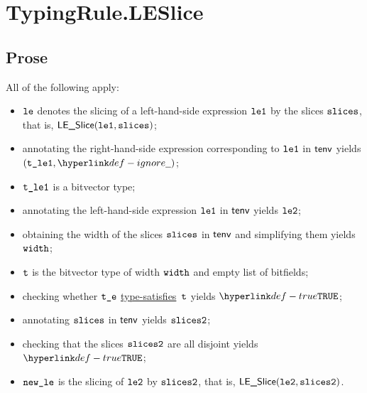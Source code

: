 \documentclass{book}
\newcommand\ProseOrTypeError[0]{\ProseTerminateAs{\TypeErrorConfig}}
\newcommand\typesatisfies[0]{\hyperlink{def-typesatisfies}{type-satisfies}}
\begin{document}

\section{TypingRule.LESlice \label{sec:TypingRule.LESlice}}

\subsection{Prose}
All of the following apply:
\begin{itemize}
  \item $\texttt{le}$ denotes the slicing of a left-hand-side expression $\texttt{le1}$ by the slices $\texttt{slices}$, that is, $\textsf{LE\_Slice}(\texttt{le1}, \texttt{slices})$;
  \item annotating the right-hand-side expression corresponding to $\texttt{le1}$ in $\textsf{tenv}$ yields \\
        $(\vtleone, \Ignore)$\ProseOrTypeError;
  \item $\texttt{t\_le1}$ is a bitvector type;
  \item annotating the left-hand-side expression $\texttt{le1}$ in $\textsf{tenv}$ yields $\texttt{le2}$\ProseOrTypeError;
  \item obtaining the width of the slices $\texttt{slices}$ in $\textsf{tenv}$ and simplifying them yields $\texttt{width}$;
  \item $\texttt{t}$ is the bitvector type of width $\texttt{width}$ and empty list of bitfields;
  \item checking whether $\texttt{t\_e}$ \typesatisfies\ $\texttt{t}$ yields $\True$\ProseOrTypeError;
  \item annotating $\texttt{slices}$ in $\textsf{tenv}$ yields $\texttt{slices2}$\ProseOrTypeError;
  \item checking that the slices $\texttt{slices2}$ are all disjoint yields $\True$\ProseOrTypeError;
  \item $\texttt{new\_le}$ is the slicing of $\texttt{le2}$ by $\texttt{slices2}$, that is, $\textsf{LE\_Slice}(\texttt{le2}, \texttt{slices2})$.
\end{itemize}


\end{document}

